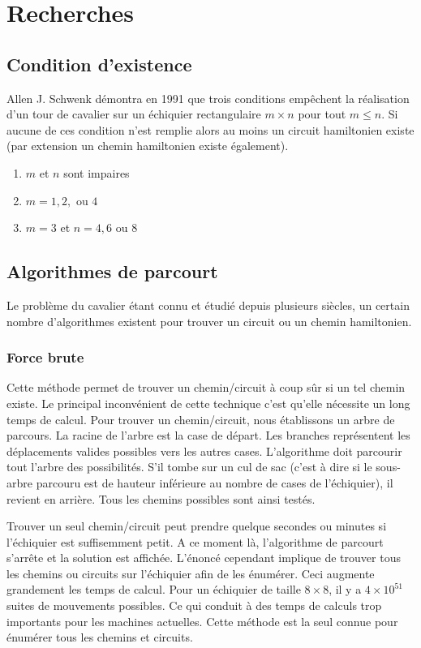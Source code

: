 \section{Recherches}
\subsection{Condition d'existence}
Allen J. Schwenk démontra en 1991 que trois conditions empêchent la réalisation d'un tour de cavalier sur un échiquier rectangulaire $m \times n$  pour tout $m \leq n$. Si aucune de ces condition n'est remplie alors au moins un circuit hamiltonien existe (par extension un chemin hamiltonien existe également).
\begin{enumerate}
\item $m$ et $n$ sont impaires
\item $m = 1,2,$ ou $4$
\item $m = 3$ et $n = 4,6$ ou $8$
\end{enumerate}

\subsection{Algorithmes de parcourt}
Le problème du cavalier étant connu et étudié depuis plusieurs siècles, un certain nombre d'algorithmes existent pour trouver un circuit ou un chemin hamiltonien.

\subsubsection{Force brute}
Cette méthode permet de trouver un chemin/circuit à coup sûr si un tel chemin existe. Le principal inconvénient de cette technique c'est qu'elle nécessite un long temps de calcul. Pour trouver un chemin/circuit, nous établissons un arbre de parcours. La racine de l'arbre est la case de départ. Les branches représentent les déplacements valides possibles vers les autres cases. L'algorithme doit parcourir tout l'arbre des possibilités. S’il tombe sur un cul de sac (c'est à dire si le sous-arbre parcouru est de hauteur inférieure au nombre de cases de l'échiquier), il revient en arrière. Tous les chemins possibles sont ainsi testés.

Trouver un seul chemin/circuit peut prendre quelque secondes ou minutes si l'échiquier est suffisemment petit. A ce moment là, l'algorithme de parcourt s'arrête et la solution est affichée. L'énoncé cependant implique de trouver tous les chemins ou circuits sur l'échiquier afin de les énumérer. Ceci augmente grandement les temps de calcul.  Pour un échiquier de taille $8 \times 8$, il y a $ 4 \times 10^{51}$ suites de mouvements possibles. Ce qui conduit à des temps de calculs trop importants pour les machines actuelles. 
Cette méthode est la seul connue pour énumérer tous les chemins et circuits.

